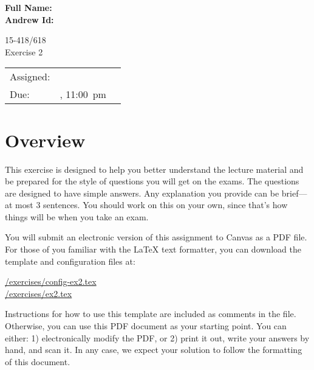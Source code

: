 \documentclass[11pt]{article}
\newcommand{\cref}[2]{\href{#1}{\color{blue}#2}}
\begin{document}
\begin{flushright}
{\large\bf Full Name: \makebox[2in][l]{

}} \\[1ex]

{\large\bf Andrew Id: \makebox[2in][l]{\tt

}} \\[1ex]
\end{flushright}
\vspace*{0.3in}
\begin{center}
\LARGE
15-418/618 \thisterm{} \\
Exercise 2
\\ 
\end{center}

\begin{center}
\Large
\begin{tabular}{lll}
\hline
Assigned: & \dateassigned{} \\
Due: &  \datedueregistered{}, 11:00~pm\\
\hline
\end{tabular}
\end{center}

\section*{Overview}

This exercise is designed to help you better understand the lecture
material and be prepared for the style of questions you will get on
the exams.  The questions are designed to have simple answers.  Any
explanation you provide can be brief---at most 3 sentences.
You should work on this on your own, since that's how things will be when
you take an exam.

You will submit an electronic version of this assignment to Canvas as
a PDF file.  For those of you familiar with the \LaTeX{} text formatter, you can download the template and configuration files at:
\begin{center}
  \cref{\actualcoursehome/exercises/config-ex2.tex}{\visiblecoursehome/exercises/config-ex2.tex}\\
  \cref{\actualcoursehome/exercises/ex2.tex}{\visiblecoursehome/exercises/ex2.tex}
\end{center}
Instructions for how to use this template are included as comments in the file.  Otherwise,
you can use this PDF document as your starting point.
You can either: 1) electronically modify the PDF, or 2) print it
out, write your answers by hand, and scan it.  In any case, we expect
your solution to follow the formatting of this document.
\end{document}
